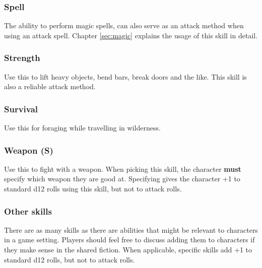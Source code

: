 \begin{multicols}{2}
\subsubsection*{Spell}
The ability to perform magic spells, can also serve as an attack method when using an attack spell. Chapter \ref{sec:magic} explains the usage of this skill in detail.
\subsubsection*{Strength}
Use this to lift heavy objects, bend bars, break doors and the like. This skill is also a reliable attack method.
\subsubsection*{Survival}
Use this for foraging while travelling in wilderness.
\subsubsection*{Weapon (S)}
Use this to fight with a weapon. When picking this skill, the character \textbf{must} specify which weapon they are good at. Specifying gives the character +1 to standard d12 rolls using this skill, but not to attack rolls.
\subsubsection*{Other skills}
There are as many skills as there are abilities that might be relevant to characters in a game setting. Players should feel free to discuss adding them to characters if they make sense in the shared fiction. When applicable, specific skills add +1 to standard d12 rolls, but not to attack rolls.
\end{multicols}


